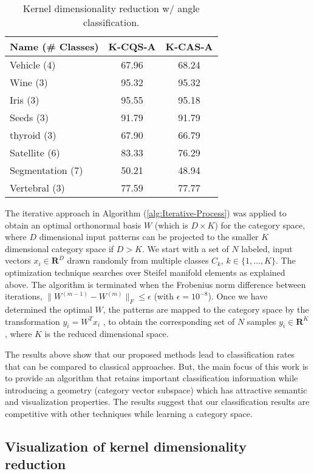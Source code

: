 \begin{table}[H]
\medskip{}

\caption{Kernel dimensionality reduction w/ angle classification. \label{tab:List-of-test-results-kernel-zscore-angle}}

\centering{}%
\begin{tabular}{lcc}
\hline 
\textbf{Name (\# Classes)} & \textbf{K-CQS-A} & \textbf{K-CAS-A}\tabularnewline
\hline 
Vehicle (4) & 67.96 & 68.24\tabularnewline
Wine (3) & 95.32 & 95.32\tabularnewline
Iris (3) & 95.55 & 95.18\tabularnewline
Seeds (3) & 91.79 & 91.79\tabularnewline
thyroid (3) & 67.90 & 66.79\tabularnewline
Satellite (6) & 83.33 & 76.29\tabularnewline
Segmentation (7) & 50.21 & 48.94\tabularnewline
Vertebral (3) & 77.59 & 77.77\tabularnewline
\hline 
\end{tabular}
\end{table}

The iterative approach in Algorithm (\ref{alg:Iterative-Process})
was applied to obtain an optimal orthonormal basis $W$ (which is
$D\times K$) for the category space, where $D$ dimensional input
patterns can be projected to the smaller $K$ dimensional category
space if $D>K$. We start with a set of $N$ labeled, input vectors
$x_{i}\in\mathbf{R}^{D}$ drawn randomly from multiple classes $C_{k},\,k\in\{1,\ldots,K\}$.
The optimization technique searches over Steifel manifold elements
as explained above. The algorithm is terminated when the Frobenius
norm difference between iterations, $\|W^{(m-1)}-W^{(m)}\|_{F}\le\epsilon$
(with $\epsilon=10^{-8}$). Once we have determined the optimal $W$,
the patterns are mapped to the category space by the transformation
$y_{i}=W^{T}x_{i}$ , to obtain the corresponding set of $N$ samples
$y_{i}\in\mathbf{R}^{K}$ , where $K$ is the reduced dimensional
space. 

The results above show that our proposed methods lead to classification
rates that can be compared to classical approaches. But, the main
focus of this work is to provide an algorithm that retains important
classification information while introducing a geometry (category
vector subspace) which has attractive semantic and visualization properties.
The results suggest that our classification results are competitive
with other techniques while learning a category space.

\subsection{Visualization of kernel dimensionality reduction}

